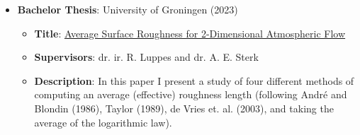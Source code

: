 \begin{itemize}
\begin{itemize}
        model. However, the kernel transformations inherent to particle dynamics
        introduce a nonlinear state dependent term. To this end, I evaluate
        three methods: linearisation, random Fourier features, and a singular
        value decomposition based interpolation. 
    \end{itemize}
    \item \textbf{Bachelor Thesis}: University of Groningen (2023) \begin{itemize}
        \item \textbf{Title}: \href{https://milenemdvl.github.io/CV/theses/BachelorThesis.pdf}{Average Surface Roughness for 2-Dimensional Atmospheric Flow}
        \item \textbf{Supervisors}: dr. ir. R. Luppes and dr. A. E. Sterk 
        \item \textbf{Description}: In this paper I present a study of four different methods of computing an
        average (effective) roughness length (following André and Blondin (1986), Taylor
        (1989), de Vries et. al. (2003), and taking the average of the
        logarithmic law).
    \end{itemize}
\end{itemize}